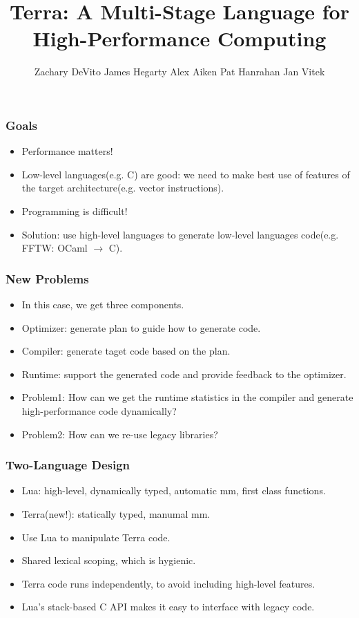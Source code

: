 \documentclass{beamer}
\begin{document}
\title{Terra: A Multi-Stage Language for High-Performance Computing}
\author{Zachary DeVito James Hegarty Alex Aiken Pat Hanrahan Jan Vitek}

\maketitle

\begin{frame}
	\frametitle{Goals}
  \begin{itemize}
  \item Performance matters!\pause
  \item Low-level languages(e.g. C) are good: we need to make best use of features of the target architecture(e.g. vector instructions).\pause
  \item Programming is difficult!\pause
  \item Solution: use high-level languages to generate low-level languages code(e.g. FFTW: OCaml $\rightarrow$ C).
  \end{itemize}
\end{frame}

\begin{frame}
	\frametitle{New Problems}
  \begin{itemize}
  \item In this case, we get three components.\pause
  \item Optimizer: generate plan to guide how to generate code.\pause
  \item Compiler: generate taget code based on the plan.\pause
  \item Runtime: support the generated code and provide feedback to the optimizer.\pause
  \item Problem1: How can we get the runtime statistics in the compiler and generate high-performance code dynamically?\pause
  \item Problem2: How can we re-use legacy libraries?
  \end{itemize}
\end{frame}

\begin{frame}
  \frametitle{Two-Language Design}
  \begin{itemize}
  \item Lua: high-level, dynamically typed, automatic mm, first class functions.\pause
  \item Terra(new!): statically typed, manumal mm.\pause
  \item Use Lua to manipulate Terra code.\pause
  \item Shared lexical scoping, which is hygienic.\pause
  \item Terra code runs independently, to avoid including high-level features.\pause
  \item Lua's stack-based C API makes it easy to interface with legacy code.
  \end{itemize}
\end{frame}
\end{document}
